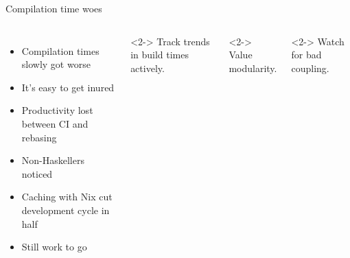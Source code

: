\documentclass[aspectratio=169,ignorenonframetext]{beamer}
\begin{document}
\begin{frame}{Compilation time woes}
	\begin{columns}
		\begin{itemize}
			\item Compilation times slowly got worse
			\item It's easy to get inured
			\item Productivity lost between CI and rebasing
			\item Non-Haskellers noticed
			\item Caching with Nix cut development cycle in half
			\item Still work to go
		\end{itemize}
		\begin{exampleblock}<2->{}
			Track trends in build times actively.
		\end{exampleblock}
		\begin{exampleblock}<2->{}
			Value modularity.
		\end{exampleblock}
		\begin{exampleblock}<2->{}
			Watch for bad coupling.
		\end{exampleblock}
	\end{columns}
\end{frame}
\end{document}
